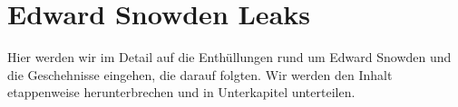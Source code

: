 \section{Edward Snowden Leaks}
Hier werden wir im Detail auf die Enthüllungen rund um Edward Snowden und die Geschehnisse eingehen, die darauf folgten. Wir werden den Inhalt etappenweise herunterbrechen und in Unterkapitel unterteilen.
